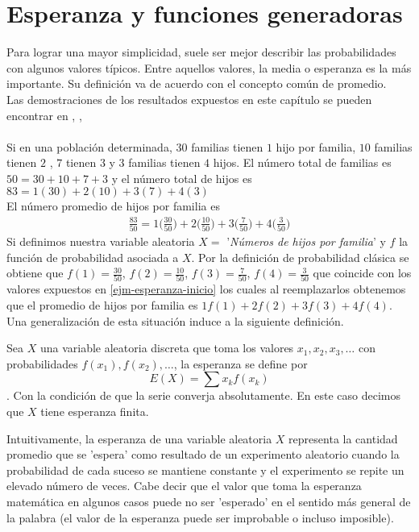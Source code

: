 \section{Esperanza y funciones generadoras}
Para lograr una mayor simplicidad, suele ser mejor describir las probabilidades con algunos valores típicos. Entre aquellos valores, la media o esperanza es la más importante. Su definición va de acuerdo con el concepto común de promedio. \\Las demostraciones de los resultados expuestos en este capítulo se pueden encontrar en \cite{Rincon1}, \cite{Rincon2},  \cite{Feller}
\\\\
Si en una población determinada, $30$ familias tienen $1$ hijo por familia, $10$ familias tienen $2$ , $7$ tienen $3$ y $3$ familias tienen $4$ hijos. El número total de familias es $50=30+10+7+3$ y el número total de hijos es $83=1(30)+2(10)+3(7)+4(3)$\\
El número promedio de hijos por familia es 
\begin{eqnarray}
    \label{ejm-esperanza-inicio}
    \frac{83}{50}= 1\big(\frac{30}{50}\big)+2\big(\frac{10}{50}\big)+3\big(\frac{7}{50}\big)+4\big(\frac{3}{50}\big)
\end{eqnarray}
Si definimos nuestra variable aleatoria $X=$ '\textit{Números de hijos por familia}' y $f$ la función de probabilidad asociada a $X$. Por la definición de probabilidad clásica se obtiene que $f(1)=\frac{30}{50}$, $f(2)=\frac{10}{50}$, $f(3)=\frac{7}{50}$, $f(4)=\frac{3}{50}$ que coincide con los valores expuestos en \ref{ejm-esperanza-inicio} los cuales al reemplazarlos obtenemos que el promedio de hijos por familia es $1f(1)+2f(2)+3f(3)+4f(4)$.\\
Una generalización de esta situación induce a la siguiente definición.
\begin{Def}
    Sea $X$ una variable aleatoria discreta que toma los valores $x_1,x_2,x_3,\ldots$ con probabilidades $f(x_1), f(x_2),\ldots$, la esperanza se define por $$E(X)=\sum x_k f(x_k)$$. Con la condición de que la serie converja absolutamente. En este caso decimos que $X$ tiene esperanza finita.
\end{Def}
Intuitivamente, la esperanza de una variable aleatoria $X$ representa la cantidad promedio que se 'espera' como resultado de un experimento aleatorio cuando la probabilidad de cada suceso se mantiene constante y el experimento se repite un elevado número de veces. Cabe decir que el valor que toma la esperanza matemática en algunos casos puede no ser 'esperado' en el sentido más general de la palabra (el valor de la esperanza puede ser improbable o incluso imposible). 

